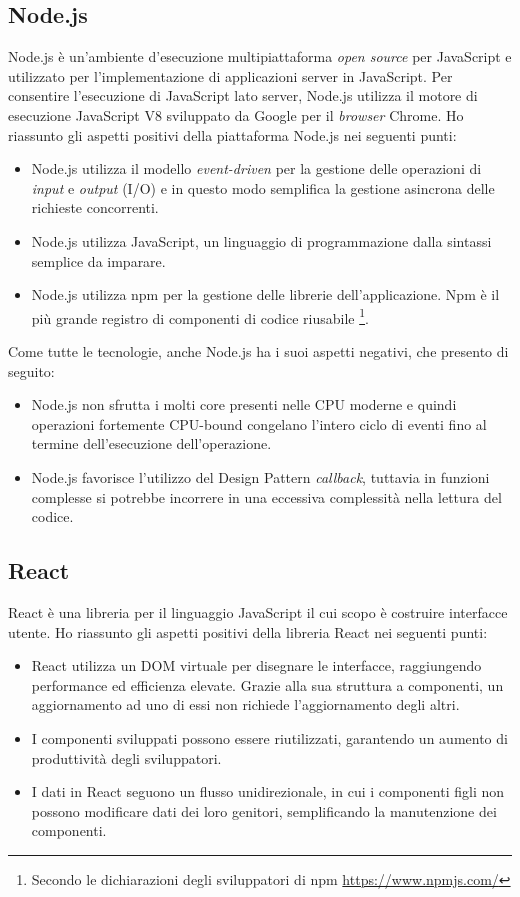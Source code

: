 \subsection{Node.js}

Node.js è un'ambiente d'esecuzione multipiattaforma \emph{open source} per JavaScript e utilizzato per l'implementazione di applicazioni server in JavaScript.
Per consentire l'esecuzione di JavaScript lato server, Node.js utilizza il motore di esecuzione JavaScript V8 sviluppato da Google per il \emph{browser} Chrome.
Ho riassunto gli aspetti positivi della piattaforma Node.js nei seguenti punti:
\begin{itemize}
  \item Node.js utilizza il modello \emph{event-driven} per la gestione delle operazioni di \emph{input} e \emph{output} (I/O) e in questo modo semplifica la gestione asincrona delle richieste concorrenti.
  \item Node.js utilizza JavaScript, un linguaggio di programmazione dalla sintassi semplice da imparare.
  \item Node.js utilizza npm per la gestione delle librerie dell'applicazione. Npm è il più grande registro di componenti di codice riusabile \footnote{Secondo le dichiarazioni degli sviluppatori di npm \url{https://www.npmjs.com/}}.
\end{itemize}

Come tutte le tecnologie, anche Node.js ha i suoi aspetti negativi, che presento di seguito:
\begin{itemize}
  \item Node.js non sfrutta i molti core presenti nelle CPU moderne e quindi operazioni fortemente CPU-bound congelano l'intero ciclo di eventi fino al termine dell'esecuzione dell'operazione.
  \item Node.js favorisce l'utilizzo del Design Pattern \emph{callback}, tuttavia in funzioni complesse si potrebbe incorrere in una eccessiva complessità nella lettura del codice.
\end{itemize}

\subsection{React}

React è una libreria per il linguaggio JavaScript il cui scopo è costruire interfacce utente.
Ho riassunto gli aspetti positivi della libreria React nei seguenti punti:
\begin{itemize}
	\item React utilizza un DOM virtuale per disegnare le interfacce, raggiungendo performance ed efficienza elevate. Grazie alla sua struttura a componenti, un aggiornamento ad uno di essi non richiede l'aggiornamento degli altri.
	\item I componenti sviluppati possono essere riutilizzati, garantendo un aumento di produttività degli sviluppatori.
	\item I dati in React seguono un flusso unidirezionale, in cui i componenti figli non possono modificare dati dei loro genitori, semplificando la manutenzione dei componenti.
\end{itemize}

